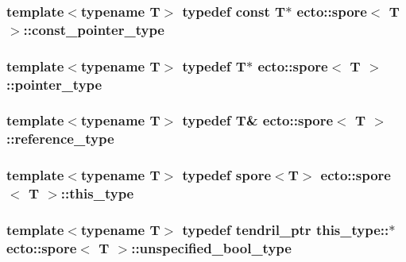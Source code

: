 \subsubsection[{const\+\_\+pointer\+\_\+type}]{\setlength{\rightskip}{0pt plus 5cm}template$<$typename T$>$ typedef const T$\ast$ {\bf ecto\+::spore}$<$ T $>$\+::{\bf const\+\_\+pointer\+\_\+type}}\label{structecto_1_1spore_af1219cc7b5343824699fc7f66a5c5891}
\hypertarget{structecto_1_1spore_af00c161eec3285210e59c856aff26456}{}
\subsubsection[{pointer\+\_\+type}]{\setlength{\rightskip}{0pt plus 5cm}template$<$typename T$>$ typedef T$\ast$ {\bf ecto\+::spore}$<$ T $>$\+::{\bf pointer\+\_\+type}}\label{structecto_1_1spore_af00c161eec3285210e59c856aff26456}
\hypertarget{structecto_1_1spore_a79afa6b324736afc257bc89c6c770f81}{}
\subsubsection[{reference\+\_\+type}]{\setlength{\rightskip}{0pt plus 5cm}template$<$typename T$>$ typedef T\& {\bf ecto\+::spore}$<$ T $>$\+::{\bf reference\+\_\+type}}\label{structecto_1_1spore_a79afa6b324736afc257bc89c6c770f81}
\hypertarget{structecto_1_1spore_aa1e4c8dec72f4671c3469b84136677e4}{}
\subsubsection[{this\+\_\+type}]{\setlength{\rightskip}{0pt plus 5cm}template$<$typename T$>$ typedef {\bf spore}$<$T$>$ {\bf ecto\+::spore}$<$ T $>$\+::{\bf this\+\_\+type}}\label{structecto_1_1spore_aa1e4c8dec72f4671c3469b84136677e4}
\hypertarget{structecto_1_1spore_a162474193fb3865f81f8b49b74858aa3}{}
\subsubsection[{unspecified\+\_\+bool\+\_\+type}]{\setlength{\rightskip}{0pt plus 5cm}template$<$typename T$>$ typedef {\bf tendril\+\_\+ptr} this\+\_\+type\+::$\ast$ {\bf ecto\+::spore}$<$ T $>$\+::{\bf unspecified\+\_\+bool\+\_\+type}}\label{structecto_1_1spore_a162474193fb3865f81f8b49b74858aa3}
\hypertarget{structecto_1_1spore_af36d72731a0e1b823de1b411c34b1a1c}{}
